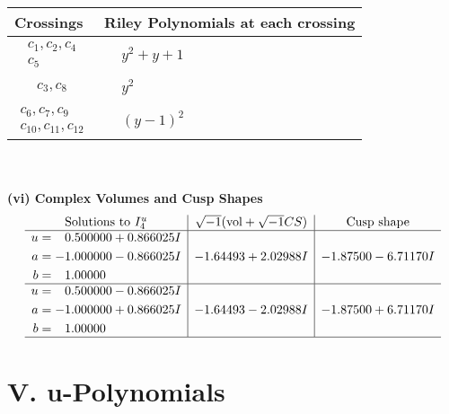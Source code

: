 \documentclass[1p]{elsarticle_modified}
\theoremstyle{definition}
\newcommand{\I}{\sqrt{-1}}
\begin{document}
\begin{tabular}{m{50pt}|m{274pt}}
Crossings & \hspace{64pt}Riley Polynomials at each crossing \\
\hline $$\begin{aligned}c_{1},c_{2},c_{4}\\c_{5}\end{aligned}$$&$\begin{aligned}
&y^2+y+1
\end{aligned}$\\
\hline $$\begin{aligned}c_{3},c_{8}\end{aligned}$$&$\begin{aligned}
&y^2
\end{aligned}$\\
\hline $$\begin{aligned}c_{6},c_{7},c_{9}\\c_{10},c_{11},c_{12}\end{aligned}$$&$\begin{aligned}
&(y-1)^2
\end{aligned}$\\
\hline
\end{tabular}\\~\\
\newpage\flushleft \textbf{(vi) Complex Volumes and Cusp Shapes}
$$\begin{array}{c|c|c}  
\text{Solutions to }I^u_{4}& \I (\text{vol} + \sqrt{-1}CS) & \text{Cusp shape}\\
 \hline 
\begin{aligned}
u &= \phantom{-}0.500000 + 0.866025 I \\
a &= -1.000000 - 0.866025 I \\
b &= \phantom{-}1.00000\phantom{ +0.000000I}\end{aligned}
 & -1.64493 + 2.02988 I & -1.87500 - 6.71170 I \\ \hline\begin{aligned}
u &= \phantom{-}0.500000 - 0.866025 I \\
a &= -1.000000 + 0.866025 I \\
b &= \phantom{-}1.00000\phantom{ +0.000000I}\end{aligned}
 & -1.64493 - 2.02988 I & -1.87500 + 6.71170 I\\
 \hline 
 \end{array}$$\newpage
\newpage\renewcommand{\arraystretch}{1}
\centering \section*{ V. u-Polynomials}
\end{document}

